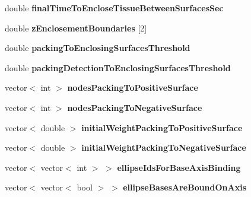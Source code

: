 \begin{DoxyCompactItemize}
\item 
\hypertarget{classSimulation_ab7ef2d249b5d20a2fc0bc399a2b34e6d}{}double {\bfseries final\+Time\+To\+Enclose\+Tissue\+Between\+Surfaces\+Sec}\label{classSimulation_ab7ef2d249b5d20a2fc0bc399a2b34e6d}

\item 
\hypertarget{classSimulation_a22bbc8742aed21f955c74c0ae2d60e59}{}double {\bfseries z\+Enclosement\+Boundaries} \mbox{[}2\mbox{]}\label{classSimulation_a22bbc8742aed21f955c74c0ae2d60e59}

\item 
\hypertarget{classSimulation_acc9eacb89b824cb028ff9e36cf2a8eda}{}double {\bfseries packing\+To\+Enclosing\+Surfaces\+Threshold}\label{classSimulation_acc9eacb89b824cb028ff9e36cf2a8eda}

\item 
\hypertarget{classSimulation_a95a1b9f341e5485d7c83e638062e1751}{}double {\bfseries packing\+Detection\+To\+Enclosing\+Surfaces\+Threshold}\label{classSimulation_a95a1b9f341e5485d7c83e638062e1751}

\item 
\hypertarget{classSimulation_a0a32a20db47180868df937d28d0d86a9}{}vector$<$ int $>$ {\bfseries nodes\+Packing\+To\+Positive\+Surface}\label{classSimulation_a0a32a20db47180868df937d28d0d86a9}

\item 
\hypertarget{classSimulation_a68757f4f41161f048823471d3bd7b60b}{}vector$<$ int $>$ {\bfseries nodes\+Packing\+To\+Negative\+Surface}\label{classSimulation_a68757f4f41161f048823471d3bd7b60b}

\item 
\hypertarget{classSimulation_a68b123f575696b61db4f4614771f1315}{}vector$<$ double $>$ {\bfseries initial\+Weight\+Packing\+To\+Positive\+Surface}\label{classSimulation_a68b123f575696b61db4f4614771f1315}

\item 
\hypertarget{classSimulation_a1a76043febe90da0da40e07d0c0335c4}{}vector$<$ double $>$ {\bfseries initial\+Weight\+Packing\+To\+Negative\+Surface}\label{classSimulation_a1a76043febe90da0da40e07d0c0335c4}

\item 
\hypertarget{classSimulation_a1ac73b375b28baf80f6b0608385b9842}{}vector$<$ vector$<$ int $>$ $>$ {\bfseries ellipse\+Ids\+For\+Base\+Axis\+Binding}\label{classSimulation_a1ac73b375b28baf80f6b0608385b9842}

\item 
\hypertarget{classSimulation_ac0d5214698a8607eee067fb8d275e479}{}vector$<$ vector$<$ bool $>$ $>$ {\bfseries ellipse\+Bases\+Are\+Bound\+On\+Axis}\label{classSimulation_ac0d5214698a8607eee067fb8d275e479}


\end{DoxyCompactItemize}
